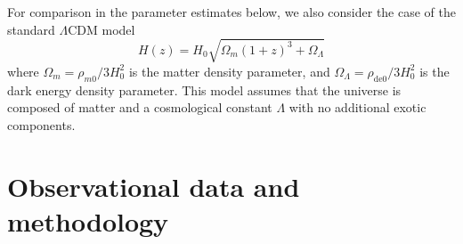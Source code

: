 \documentclass[a4paper,fleqn]{cas-sc}
\begin{document}
For comparison in the parameter estimates below, we also consider the case of the standard $\Lambda$CDM model
\begin{equation}
    H(z)=H_0\sqrt{\Omega_m(1+z)^3+\Omega_\Lambda}
\end{equation}
where   $\Omega_m=\rho_{m0}/3H_0^2$ is the matter density parameter, and $ \Omega_\Lambda=\rho_{\text{de}0}/3H_0^2$ is the dark energy density parameter. This model assumes that the universe is composed of matter and a cosmological constant $\Lambda$ with no additional exotic components.


\section{Observational data and methodology}\label{sec:data}
\end{document}
